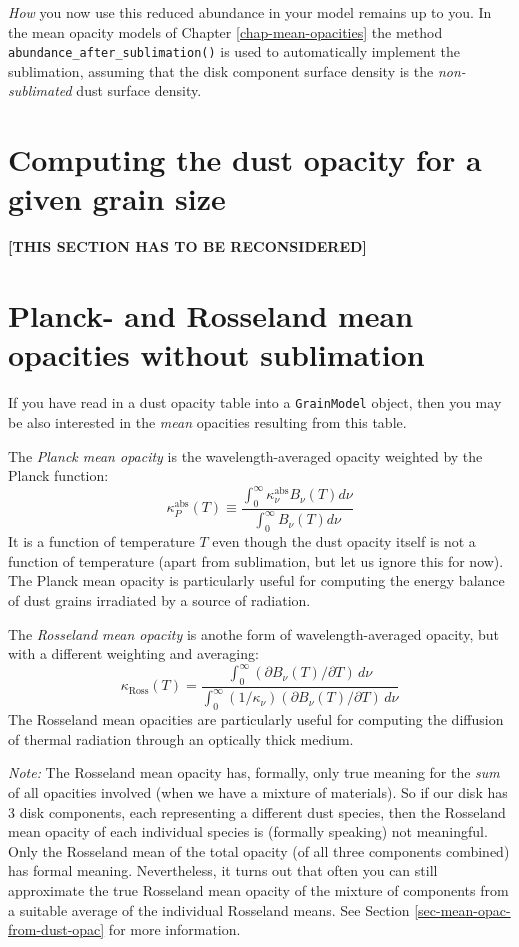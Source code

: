 \documentclass{book}
\newcommand{\code}[1]{{\small\tt #1}}
\begin{document}
{\em How} you now use this reduced abundance in your model remains up to you.
In the mean opacity models of Chapter \ref{chap-mean-opacities} the method
\code{abundance\_after\_sublimation()} is used to automatically implement the
sublimation, assuming that the disk component surface density is the {\em
  non-sublimated} dust surface density.



\section{Computing the dust opacity for a given grain size}
\label{sec-compute-dust-opacity-from-agrain-xigrain}
%

{\bf [THIS SECTION HAS TO BE RECONSIDERED]}


\section{Planck- and Rosseland mean opacities without sublimation}
\label{sec-grain-computing-mean-opacities}
%
If you have read in a dust opacity table into a \code{GrainModel}
object, then you may be also interested in the {\em mean} opacities
resulting from this table.

The {\em Planck mean opacity} is the wavelength-averaged opacity
weighted by the Planck function:
\begin{equation}
\kappa_P^{\mathrm{abs}}(T) \equiv
\frac{\int_0^\infty \kappa^{\mathrm{abs}}_\nu B_\nu(T)d\nu}{\int_0^\infty B_\nu(T)d\nu}
\end{equation}
It is a function of temperature $T$ even though the dust opacity itself is not a
function of temperature (apart from sublimation, but let us ignore this for
now). The Planck mean opacity is particularly useful for computing the energy
balance of dust grains irradiated by a source of radiation.

The {\em Rosseland mean opacity} is anothe form of wavelength-averaged opacity,
but with a different weighting and averaging:
\begin{equation}
\kappa_{\mathrm{Ross}}(T) =
\frac{\int_0^\infty (\partial B_\nu(T)/\partial T)\,d\nu}
{\int_0^\infty (1/\kappa_\nu)(\partial B_\nu(T)/\partial T)\,d\nu}
\end{equation}
The Rosseland mean opacities are particularly useful for computing the diffusion
of thermal radiation through an optically thick medium.

{\em Note:} The Rosseland mean opacity has, formally, only true meaning for
the {\em sum} of all opacities involved (when we have a mixture of materials).
So if our disk has 3 disk components, each representing a different dust species,
then the Rosseland mean opacity of each individual species is (formally speaking)
not meaningful. Only the Rosseland mean of the total opacity (of all three
components combined) has formal meaning. Nevertheless, it turns out that often
you can still approximate the true Rosseland mean opacity of the mixture of
components from a suitable average of the individual Rosseland means.
See Section \ref{sec-mean-opac-from-dust-opac} for more information.
\end{document}

